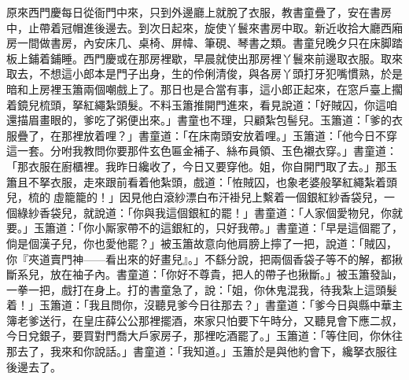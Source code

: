 原來西門慶每日從衙門中來，只到外邊廳上就脫了衣服，教書童疊了，安在書房中，止帶着冠帽進後邊去。到次日起來，旋使丫鬟來書房中取。{}新近收拾大廳西廂房一間做書房，內安床几、桌椅、屏幃、筆硯、琴書之類。書童兒晚夕只在床脚踏板上鋪着鋪睡。西門慶或在那房裡歇，早晨就使出那房裡丫鬟來前邊取衣服。取來取去，不想這小郎本是門子出身，生的伶俐清俊，與各房丫頭打牙犯嘴慣熟，於是暗和上房裡玉簫兩個嘲戲上了。那日也是合當有事，這小郎正起來，在窓戶臺上擱着鏡兒梳頭，拏紅繩紮頭髮。不料玉簫推開門進來，看見說道：「好賊囚，你這咱還描眉畫眼的，爹吃了粥便出來。」書童也不理，只顧紮包髻兒。玉簫道：「爹的衣服疊了，在那裡放着哩？」書童道：「在床南頭安放着哩。」玉簫道：「他今日不穿這一套。分咐我教問你要那件玄色匾金補子、絲布員領、玉色襯衣穿。」書童道：「那衣服在廚櫃裡。我昨日纔收了，今日又要穿他。姐，你自開門取了去。」那玉簫且不拏衣服，走來跟前看着他紮頭，戲道：「恠賊囚，也象老婆般拏紅繩紮着頭兒，梳的𩬆虛籠籠的！」{}因見他白滾紗漂白布汗褂兒上繫着一個銀紅紗香袋兒，一個綠紗香袋兒，就說道：「你與我這個銀紅的罷！」書童道：「人家個愛物兒，你就要。」玉簫道：「你小厮家帶不的這銀紅的，只好我帶。」{}書童道：「早是這個罷了，倘是個漢子兒，你也愛他罷？」{}被玉簫故意向他肩膀上擰了一把，說道：「賊囚，你『夾道賣門神——看出來的好畫兒』。」不繇分說，把兩個香袋子等不的解，都揪斷系兒，放在袖子內。{}書童道：「你好不尊貴，把人的帶子也揪斷。」被玉簫發訕，一拳一把，戲打在身上。打的書童急了，說：「姐，你休鬼混我，待我紮上這頭髮着！」玉簫道：「我且問你，沒聽見爹今日往那去？」書童道：「爹今日與縣中華主簿老爹送行，在皇庄薛公公那裡擺酒，來家只怕要下午時分，又聽見會下應二叔，今日兌銀子，要買對門喬大戶家房子，那裡吃酒罷了。」玉簫道：「等住囘，你休往那去了，我來和你說話。」書童道：「我知道。」玉簫於是與他約會下，纔拏衣服往後邊去了。

